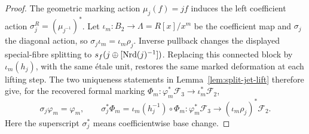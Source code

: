 \begin{proof}
The geometric marking action \(\mu_j(f)=jf\) induces the left coefficient
action \(\sigma_j^R=(\mu_{j^{-1}})^*\). Let
\(\iota_m:B_2\to\Lambda=R[x]/x^m\) be the coefficient map and
\(\sigma_j\) the diagonal action, so \(\sigma_j\iota_m=\iota_m\rho_j\).
Inverse pullback changes the displayed special-fibre splitting to
\(s_f(j\oplus[\operatorname{Nrd}(j)^{-1}])\). Replacing this connected block by
\(\iota_m(h_j)\), with the same étale unit, restores the same marked
deformation at each lifting step. The two uniqueness statements in
Lemma~\ref{lem:split-jet-lift} therefore give, for the recovered formal
marking \(\Phi_m:\varphi_m^*\mathcal F_3\to\iota_m^*\mathcal F_2\),
\[
 \sigma_j\varphi_m=\varphi_m,\qquad
 \sigma_j^*\Phi_m=\iota_m(h_j^{-1})\circ\Phi_m:
 \varphi_m^*\mathcal F_3\longrightarrow(\iota_m\rho_j)^*\mathcal F_2.
\]
Here the superscript \(\sigma_j^*\) means coefficientwise base change.


\end{proof}
